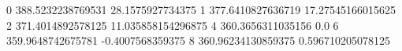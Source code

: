 0 388.5232238769531 28.1575927734375
1 377.6410827636719 17.27545166015625
2 371.4014892578125 11.035858154296875
4 360.3656311035156 0.0
6 359.9648742675781 -0.4007568359375
8 360.96234130859375 0.596710205078125
